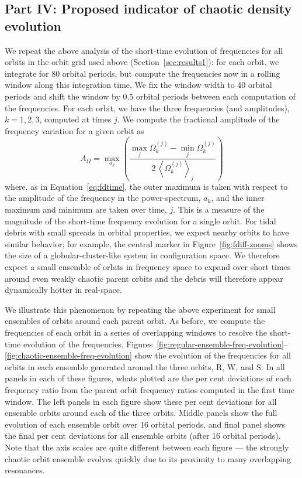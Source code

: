 \documentclass[letterpaper,12pt,preprint]{aastex}
\newcommand{\mean}[1]{\left< #1 \right>}
\begin{document}
\subsection{Part IV: Proposed indicator of chaotic density evolution}\label{sec:results4}

We repeat the above analysis of the short-time evolution of frequencies for all orbits in the orbit grid used above (Section~\ref{sec:results1}): for each orbit, we integrate for 80 orbital periods, but compute the frequencies now in a rolling window along this integration time. We fix the window width to 40 orbital periods and shift the window by 0.5 orbital periods between each computation of the frequencies. For each orbit, we have the three frequencies (and amplitudes), $k=1,2,3$, computed at times $j$. We compute the fractional amplitude of the frequency variation for a given orbit as
\begin{equation}
	A_\Omega = \max_{a_k} \left(\frac{\max_j \Omega^{(j)}_{k} - \min_j \Omega^{(j)}_{k}}{2 \, \mean{\Omega^{(j)}_{k}}_j}\right) \label{eq:frac-freq-amp}
\end{equation}
where, as in Equation~\ref{eq:fdtime}, the outer maximum is taken with respect to the amplitude of the frequency in the power-spectrum, $a_k$, and the inner maximum and minimum are taken over time, $j$. This is a measure of the magnitude of the short-time frequency evolution for a single orbit. For tidal debris with small spreads in orbital properties, we expect nearby orbits to have similar behavior; for example, the central marker in Figure~\ref{fig:fdiff-zooms} shows the size of a globular-cluster-like system in configuration space. We therefore expect a small ensemble of orbits in frequency space to expand over short times around even weakly chaotic parent orbits and the debris will therefore appear dynamically hotter in real-space. 

We illustrate this phenomenon by repeating the above experiment for small ensembles of orbits around each parent orbit. As before, we compute the frequencies of each orbit in a series of overlapping windows to resolve the short-time evolution of the frequencies. Figures~\ref{fig:regular-ensemble-freq-evolution}--\ref{fig:chaotic-ensemble-freq-evolution} show the evolution of the frequencies for all orbits in each ensemble generated around the three orbits, R, W, and S. In all panels in each of these figures, whats plotted are the per cent deviations of each frequency ratio from the parent orbit frequency ratios computed in the first time window. The left panels in each figure show these per cent deviations for all ensemble orbits around each of the three orbits. Middle panels show the full evolution of each ensemble orbit over 16 orbital periods, and final panel shows the final per cent deviations for all ensemble orbits (after 16 orbital periods). Note that the axis scales are quite different between each figure --- the strongly chaotic orbit ensemble evolves quickly due to its proximity to many overlapping resonances. 
\end{document}
